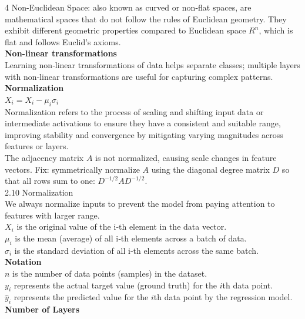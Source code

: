 \documentclass[8pt]{extarticle}
\begin{document}
\begin{multicols}{4}
Non-Euclidean Space: also known as curved or non-flat spaces, are mathematical spaces that do not follow the rules of Euclidean geometry. They exhibit different geometric properties compared to Euclidean space $R^{n}$, which is flat and follows Euclid’s axioms.\\
\vspace{2pt}\textbf{Non-linear transformations}\\
Learning non‑linear transformations of data helps separate classes; multiple layers with non‑linear transformations are useful for capturing complex patterns.\\
\vspace{2pt}\textbf{Normalization}\\
$X_i = X_i - \mu_i \sigma_i$\\
Normalization refers to the process of scaling and shifting input data or intermediate activations to ensure they have a consistent and suitable range, improving stability and convergence by mitigating varying magnitudes across features or layers.\\
The adjacency matrix $A$ is not normalized, causing scale changes in feature vectors. Fix: symmetrically normalize $A$ using the diagonal degree matrix $D$ so that all rows sum to one: $D^{-1/2} A D^{-1/2}$.\\
2.10 Normalization\\
We always normalize inputs to prevent the model from paying attention to features with larger range.\\
$X_i$ is the original value of the i‑th element in the data vector.\\
$\mu_i$ is the mean (average) of all i‑th elements across a batch of data.\\
$\sigma_i$ is the standard deviation of all i‑th elements across the same batch.\\
\vspace{2pt}\textbf{Notation}\\
$n$ is the number of data points (samples) in the dataset.\\
$y_i$ represents the actual target value (ground truth) for the $i$th data point.\\
$\hat{y}_i$ represents the predicted value for the $i$th data point by the regression model.\\
\vspace{2pt}\textbf{Number of Layers}\\


\end{multicols}
\end{document}
